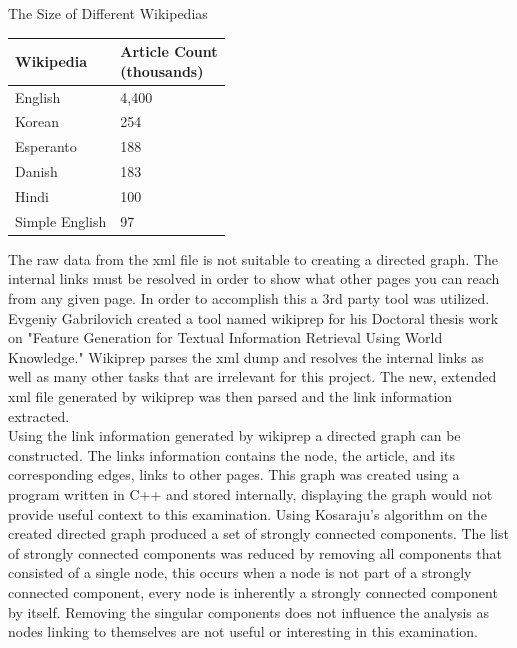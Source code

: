 \documentclass[twoside]{article}
\makeatletter
\newenvironment{tablehere}
  {\def\@captype{table}}
  {}
\makeatother
\begin{document}
\begin{multicols}{2}
\begin{tablehere}

\caption{The Size of Different Wikipedias  \cite{wikipediaStatistics}}

\begin{tabular}{| l | l |}

\hline

Wikipedia & \parbox[t]{3cm} {Article Count \\ (thousands)}   \\ \hline

English & 4,400 \\ \hline

Korean & 254 \\ \hline

Esperanto & 188  \\ \hline

Danish & 183 \\ \hline

Hindi & 100 \\ \hline

Simple English & 97  \\ \hline

\end{tabular}

\end{tablehere}

\vspace{10 mm}

The raw data from the xml file is not suitable to creating a directed graph. The internal links must be resolved
in order to show what other pages you can reach from any given page. In order to accomplish this a 3rd party tool
was utilized. Evgeniy Gabrilovich created a tool named wikiprep for his Doctoral thesis work on "Feature Generation for Textual
Information Retrieval Using World Knowledge." \cite{Gabrilovich} Wikiprep parses the xml dump and resolves the internal
links as well as many other tasks that are irrelevant for this project. The new, extended xml file generated
by wikiprep was then parsed and the link information extracted.\\

Using the link information generated by wikiprep a directed graph can be constructed. The links information
contains the node, the article, and its corresponding edges, links to other pages. This graph was 
created using a program written in C++ and stored internally, displaying the graph would not provide
useful context to this examination. Using Kosaraju's algorithm on the created directed graph produced 
a set of strongly connected components. The list of strongly connected
components was reduced by removing all components that consisted of a single node, this occurs
when a node is not part of a strongly connected component, every node is inherently a strongly connected
component by itself.
Removing the singular components does not influence the analysis as nodes linking to themselves are not useful or
interesting in this examination.\\


\end{multicols}
\end{document}

